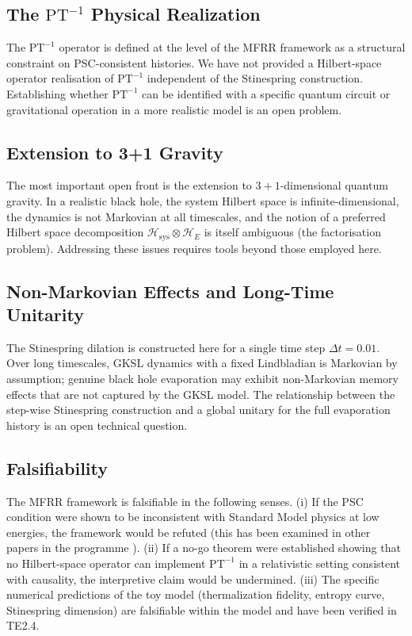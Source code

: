 \documentclass[11pt,twocolumn]{article}
\theoremstyle{remark}
\begin{document}
\subsection{The \texorpdfstring{$\mathrm{PT}^{-1}$}{PT-inverse} Physical Realization}

The $\mathrm{PT}^{-1}$ operator is defined at the level of the MFRR
framework as a structural constraint on PSC-consistent histories. We have
not provided a Hilbert-space operator realisation of $\mathrm{PT}^{-1}$
independent of the Stinespring construction. Establishing whether
$\mathrm{PT}^{-1}$ can be identified with a specific quantum circuit or
gravitational operation in a more realistic model is an open problem.

\subsection{Extension to 3+1 Gravity}

The most important open front is the extension to $3{+}1$-dimensional
quantum gravity. In a realistic black hole, the system Hilbert space is
infinite-dimensional, the dynamics is not Markovian at all timescales,
and the notion of a preferred Hilbert space decomposition
$\mathcal{H}_{\mathrm{sys}} \otimes \mathcal{H}_E$ is itself ambiguous
(the factorisation problem). Addressing these issues requires tools
beyond those employed here.

\subsection{Non-Markovian Effects and Long-Time Unitarity}

The Stinespring dilation is constructed here for a single time step
$\Delta t = 0.01$. Over long timescales, GKSL dynamics with a fixed
Lindbladian is Markovian by assumption; genuine black hole evaporation
may exhibit non-Markovian memory effects that are not captured by the
GKSL model. The relationship between the step-wise Stinespring construction
and a global unitary for the full evaporation history is an open
technical question.

\subsection{Falsifiability}

The MFRR framework is falsifiable in the following senses. (i) If the
PSC condition were shown to be inconsistent with Standard Model physics
at low energies, the framework would be refuted (this has been examined
in other papers in the programme \cite{SpivackPhysicsPortal}). (ii) If
a no-go theorem were established showing that no Hilbert-space operator
can implement $\mathrm{PT}^{-1}$ in a relativistic setting consistent
with causality, the interpretive claim would be undermined. (iii) The
specific numerical predictions of the toy model (thermalization fidelity,
entropy curve, Stinespring dimension) are falsifiable within the model
and have been verified in TE2.4.
\end{document}
